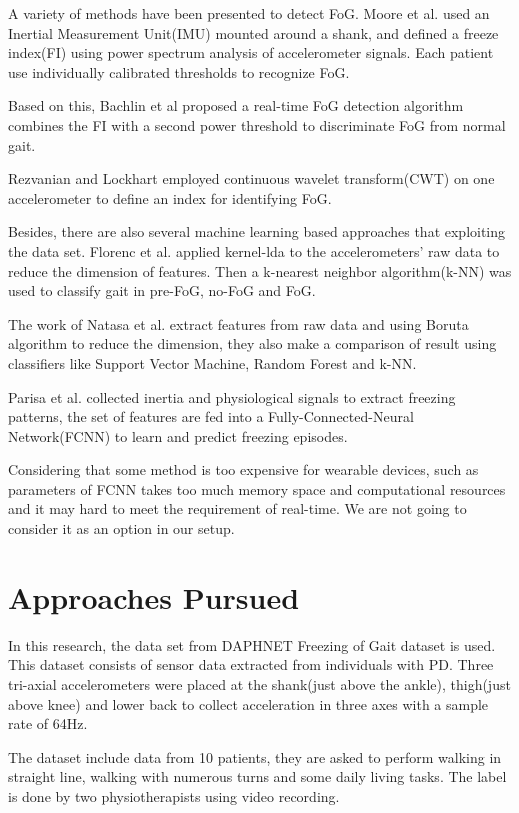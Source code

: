 \documentclass[article]{article}
\begin{document}
 	  
 	A variety of methods have been presented to detect FoG. Moore et al. used an Inertial Measurement Unit(IMU) mounted around a shank, and defined a freeze index(FI) using power spectrum analysis of accelerometer signals. Each patient use individually calibrated thresholds to recognize FoG. 
 	
 	Based on this, Bachlin et al proposed a real-time FoG detection algorithm combines the FI with a second power threshold to discriminate FoG from normal gait.
 	
 	Rezvanian and Lockhart employed continuous wavelet transform(CWT) on one accelerometer to define an index for identifying FoG. 
   
    Besides, there are also several machine learning based approaches that exploiting the data set. Florenc et al. applied kernel-lda to the accelerometers' raw data to reduce the dimension of features. Then a k-nearest neighbor algorithm(k-NN) was used to classify gait in pre-FoG, no-FoG and FoG. 
    
    The work of Natasa et al. extract features from raw data and using Boruta algorithm to reduce the dimension, they also make a comparison of result using classifiers like Support Vector Machine, Random Forest and k-NN.
    
    Parisa et al. collected  inertia and physiological signals to extract freezing patterns, the set of features are fed into a Fully-Connected-Neural Network(FCNN) to learn and predict freezing episodes.
    
    Considering that some method is too expensive for wearable devices, such as parameters of FCNN takes too much memory space and computational resources and it may hard to meet the requirement of real-time. We are not going to consider it as an option in our setup.

 
    
\section{Approaches Pursued}

 	In this research, the data set from DAPHNET Freezing of Gait dataset is used. This dataset consists of sensor data extracted from individuals with PD. Three tri-axial accelerometers were placed at the shank(just above the ankle), thigh(just above knee) and lower back to collect acceleration in three axes with a sample rate of 64Hz.

	The dataset include data from 10 patients, they are asked to perform walking in straight line, walking with numerous turns and some daily living tasks. The label is done by two physiotherapists using video recording.
\end{document}
